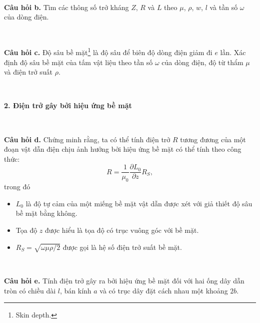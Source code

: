 \ \

\textbf{Câu hỏi b.} Tìm các thông số trở kháng \(Z\), \(R\) và \(L\) theo \(\mu\), \(\rho\), \(w\), \(l\) và tần số \(\omega\) của dòng điện.

\ \

\textbf{Câu hỏi c.} Độ sâu bề mặt\footnote{Skin depth.} là độ sâu để biên độ dòng điện giảm đi \(e\) lần. Xác định độ sâu bề mặt của tấm vật liệu theo tần số \(\omega\) của dòng điện, độ từ thẩm \(\mu\) và điện trở suất \(\rho\).

\ \

\textbf{2. Điện trở gây bởi hiệu ứng bề mặt}

\ \

\textbf{Câu hỏi d.} Chứng minh rằng, ta có thể tính điện trở \(R\) tương đương của một đoạn vật dẫn điện chịu ảnh hưởng bởi hiệu ứng bề mặt có thể tính theo công thức:
\begin{equation}
    R = \dfrac{1}{\mu_0} \dfrac{\partial L_0}{\partial z} R_S,
\end{equation}
trong đó
\begin{itemize}
    \item \(L_0\) là độ tự cảm của một miếng bề mặt vật dẫn được xét với giả thiết độ sâu bề mặt bằng không.
    \item Tọa độ \(z\) được hiểu là tọa độ có trục vuông góc với bề mặt.
    \item \(R_S = \sqrt{\omega \mu \rho/2}\) được gọi là hệ số điện trở suất bề mặt.
\end{itemize}

\ \

\textbf{Câu hỏi e.} Tính điện trở gây ra bởi hiệu ứng bề mặt đối với hai ống dây dẫn tròn có chiều dài \(l\), bán kính \(a\) và có trục dây đặt cách nhau một khoảng \(2b\).